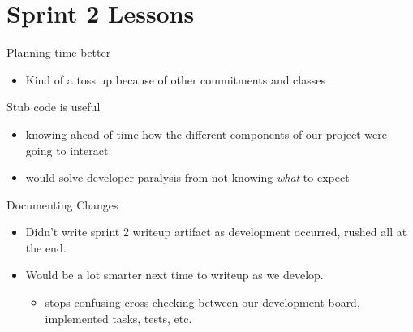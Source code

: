 \documentclass[allowframebreaks]{beamer}
\begin{document}
\section{Sprint 2 Lessons}
\label{sec:org29e542d}
\begin{frame}[label={sec:org8879abb}]{Planning time better}
\begin{itemize}
\item Kind of a toss up because of other commitments and classes
\end{itemize}
\end{frame}
\begin{frame}[label={sec:org103c1eb}]{Stub code is useful}
\begin{itemize}
\item knowing ahead of time how the different components of our project were going to interact
\item would solve developer paralysis from not knowing \emph{what} to expect
\end{itemize}
\end{frame}
\begin{frame}[label={sec:org50fabfa}]{Documenting Changes}
\begin{itemize}
\item Didn't write sprint 2 writeup artifact as development occurred, rushed all at the end.
\item Would be a lot smarter next time to writeup as we develop.
\begin{itemize}
\item stops confusing cross checking between our development board, implemented tasks, tests, etc.
\end{itemize}
\end{itemize}
\end{frame}
\end{document}
